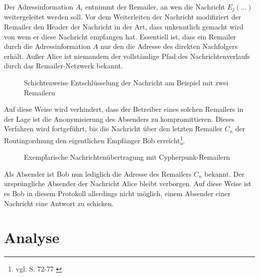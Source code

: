Der Adressinformation \(A_i\) entnimmt der Remailer, an wen die Nachricht \(E_j(...)\) weitergeleitet werden soll. Vor dem Weiterleiten der Nachricht modifiziert der Remailer den Header der Nachricht in der Art, dass unkenntlich gemacht wird von wem er diese Nachricht empfangen hat. Essentiell ist, dass ein Remailer durch die Adressinformation \(A\) nur den die Adresse des direkten Nachfolgers erhält. Außer Alice ist niemandem der vollständige Pfad des Nachrichtenverlaufs durch das Remailer-Netzwerk bekannt.

\begin{figure}
	\centering

	\caption{Schichtenweise Entschlüsselung der Nachricht am Beispiel mit zwei Remailern}
\end{figure}

Auf diese Weise wird verhindert, dass der Betreiber eines solchen Remailers in der Lage ist die Anonymisierung des Absenders zu kompromittieren. Dieses Verfahren wird fortgeführt, bis die Nachricht über den letzten Remailer \(C_n\) der Routingordnung den eigentlichen Empfänger Bob erreicht\footnote{vgl. S. 72-77 \cite{kubieziel2007anonym}}.

\begin{figure}
	\begin{center}
		\def\svgwidth{0.8 \linewidth}
		
		\caption{Exemplarische Nachrichtenübertragung mit Cypherpunk-Remailern}
	\end{center}
\end{figure}

Als Absender ist Bob nun lediglich die Adresse des Remailers \(C_n\) bekannt. Der ursprüngliche Absender der Nachricht Alice bleibt verborgen. Auf diese Weise ist es Bob in diesem Protokoll allerdings nicht möglich, einem Absender einer Nachricht eine Antwort zu schicken.

\section{Analyse}
